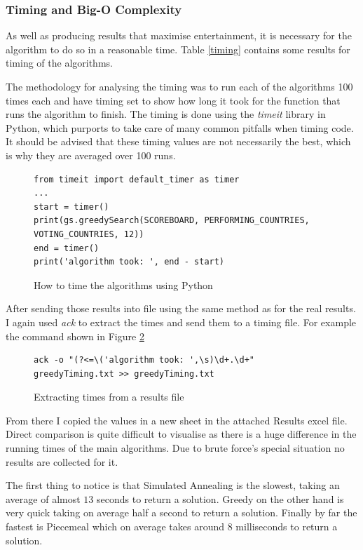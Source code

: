 \documentclass[12pt]{report}
\begin{document}
\subsubsection{Timing and Big-O Complexity}
As well as producing results that maximise entertainment, it is necessary for the algorithm to do so in a reasonable time. Table \ref{timing} contains some results for timing of the algorithms.

The methodology for analysing the timing was to run each of the algorithms 100 times each and have timing set to show how long it took for the function that runs the algorithm to finish. The timing is done using the \textit{timeit}\cite{PythonTimeit} library in Python, which purports to take care of many common pitfalls when timing code. It should be advised that these timing values are not necessarily the best, which is why they are averaged over 100 runs.

\begin{figure}[H]
\caption{How to time the algorithms using Python}
\label{timingCode}
\begin{verbatim}
from timeit import default_timer as timer
...
start = timer()
print(gs.greedySearch(SCOREBOARD, PERFORMING_COUNTRIES, VOTING_COUNTRIES, 12))
end = timer()
print('algorithm took: ', end - start)
\end{verbatim}
\end{figure}

After sending those results into file using the same method as for the real results. I again used \textit{ack} to extract the times and send them to a timing file. For example the command shown in Figure \ref{timingAck}

\begin{figure}[H]
\caption{Extracting times from a results file}
\label{timingAck}
\begin{verbatim}
ack -o "(?<=\('algorithm took: ',\s)\d+.\d+" greedyTiming.txt >> greedyTiming.txt
\end{verbatim}
\end{figure}

From there I copied the values in a new sheet in the attached Results excel file. Direct comparison is quite difficult to visualise as there is a huge difference in the running times of the main algorithms. Due to brute force's special situation no results are collected for it.

The first thing to notice is that Simulated Annealing is the slowest, taking an average of almost $13$ seconds to return a solution. Greedy on the other hand is very quick taking on average half a second to return a solution. Finally by far the fastest is Piecemeal which on average takes around $8$ milliseconds to return a solution.
\end{document}
